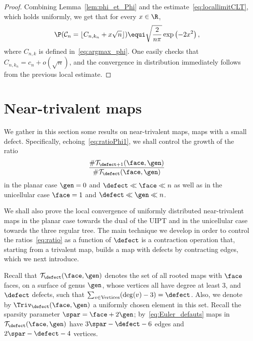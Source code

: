 \begin{proof}
Combining Lemma~\ref{lem:phi_et_Phi} and the estimate~\eqref{eq:locallimitCLT}, which holds uniformly,
we get that for every $x\in\R$,\vspace*{-3pt}
\[
\P(\mathcal{C}_{n}=\lfloor C_{n,k_{n}}+x\sqrt{n} \rfloor) \equi \sqrt{\frac{2}{n\pi}} \exp\left(-2 x^{2}\right),
\]
where $C_{n,k}$ is defined in~\eqref{eq:argmax_phi}. One easily checks that $C_{n,k_{n}} = c_n + o(\sqrt{n})$, and the convergence in distribution immediately follows from the previous local estimate.
\end{proof}

\section{Near-trivalent maps}
\label{sec:defauts_bis}

We gather in this section some results on near-trivalent maps, \ie maps with a small defect. Specifically, echoing~\eqref{eq:ratioPhi1}, we shall control the growth of the ratio\vspace*{-3pt}
\begin{equation}\label{eq:ratio}
\frac{\# \mathcal{T}_{\defect+1}(\face, \gen)}{ \# \mathcal{T}_{\defect}(\face, \gen)}
\end{equation}
in the planar case $\gen=0$ and $\defect \ll \face \ll n$ as well as in the unicellular case $\face=1$ and $\defect \ll \gen \ll n$.

We shall also prove the local convergence of uniformly distributed near-trivalent maps in the planar case towards the dual of the UIPT and in the unicellular case towards the three regular tree. The main technique we develop in order to control the ratios~\eqref{eq:ratio} as a function of $ \defect$ is a contraction operation that, starting from a trivalent map, builds a map with defects by contracting edges, which we next introduce.

Recall that $\mathcal{T}_{\defect}{(\face,\gen)}$ denotes the set of all rooted maps with $ \face$ faces, on a surface of genus $ \gen$, whose vertices all have degree at least $3$, and $\defect$ defects, \ie such that $\sum_{v \in \mathrm{Vertices}} (\deg(v)-3) = \defect$. Also, we denote by $\Triv_{ \defect}(\face,\gen)$ a uniformly chosen element in this set.
Recall the sparsity parameter $\spar=\face+2\gen$; by~\eqref{eq:Euler_defauts} maps in $\mathcal{T}_{\defect}{(\face,\gen)}$ have $3\spar-\defect-6$ edges and $2\spar-\defect-4$ vertices.


